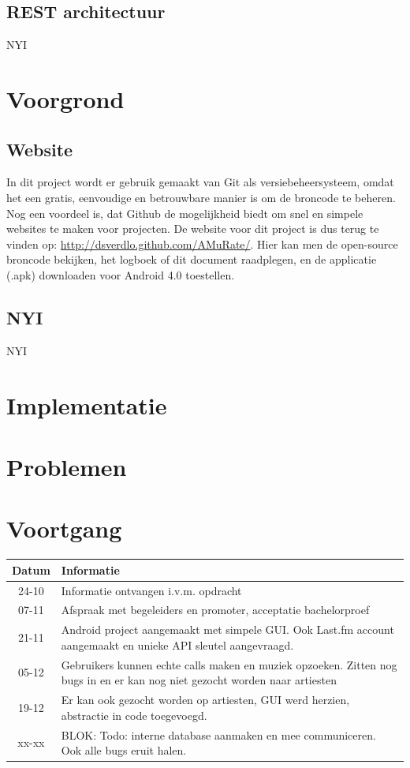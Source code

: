 \documentclass[11pt,a4paper]{article}
\begin{document}
	\subsection{REST architectuur}
	NYI
\section{Voorgrond}
	\subsection{Website}
		In dit project wordt er gebruik gemaakt van Git als versiebeheersysteem, omdat het een gratis, eenvoudige en betrouwbare manier is om de broncode te beheren. Nog een voordeel is, dat Github de mogelijkheid biedt om snel en simpele websites te maken voor projecten. De website voor dit project is dus terug te vinden op: \url{http://dsverdlo.github.com/AMuRate/}. Hier kan men de open-source broncode bekijken, het logboek of dit document raadplegen, en de applicatie (.apk) downloaden voor Android 4.0 toestellen.
	\subsection{NYI}
	NYI
\section{Implementatie}
\section{Problemen}
\section{Voortgang}
	\begin{tabular}{| c | p{\linewidth} | }
	\hline
	Datum & Informatie \\ \hline \hline 
	24-10 & Informatie ontvangen i.v.m. opdracht \\ \hline
	07-11 & Afspraak met begeleiders en promoter, acceptatie bachelorproef \\ \hline
	21-11 & Android project aangemaakt met simpele GUI. Ook Last.fm account aangemaakt en unieke API sleutel aangevraagd. \\ \hline
	05-12 & Gebruikers kunnen echte calls maken en muziek opzoeken. Zitten nog bugs in en er kan nog niet gezocht worden naar artiesten \\ \hline
	19-12 & Er kan ook gezocht worden op artiesten, GUI werd herzien, abstractie in code toegevoegd. \\ \hline
	xx-xx & BLOK: Todo: interne database aanmaken en mee communiceren. Ook alle bugs eruit halen. \\ \hline
	
	\end{tabular}
\end{document}
